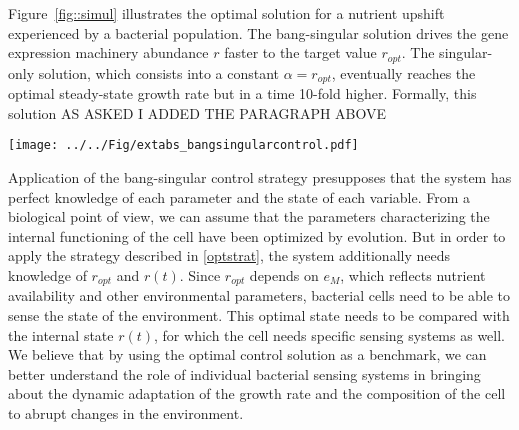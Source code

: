 \documentclass[a4paper, 10pt, conference]{ieeeconf}      %
\begin{document}
Figure~\ref{fig::simul} illustrates the optimal solution for a nutrient upshift experienced by a bacterial population. The bang-singular solution drives the gene expression machinery abundance $r$ faster to the target value $r_{opt}$. The singular-only solution, which consists into a constant $\alpha = r_{opt}$, eventually reaches the optimal steady-state growth rate but in a time 10-fold higher. Formally, this solution
{\color{blue} AS ASKED I ADDED THE PARAGRAPH ABOVE}

\begin{figure*}[h!]
\centering
\texttt{[image: ../../Fig/extabs\_bangsingularcontrol.pdf]}
\caption{\textbf{Bang-singular versus singular control strategies.}
Bang-singular control drives the gene expression machinery abundance $r$ faster to the optimal value $r_{opt}$ than singular control.}
\label{fig::simul}
\end{figure*}

Application of the bang-singular control strategy presupposes that the system has perfect knowledge of each parameter and the state of each variable.
From a biological point of view, we can assume that the parameters characterizing the internal functioning of the cell have been optimized by evolution.
But in order to apply the strategy described in \eqref{optstrat}, the system additionally needs knowledge of $r_{opt}$ and $r(t)$.
Since $r_{opt}$ depends on $e_M$, which reflects nutrient availability and other environmental parameters, bacterial cells need to be able to sense the state of the environment.
This optimal state needs to be compared with the internal state $r(t)$, for which the cell needs specific sensing systems as well.
We believe that by using the optimal control solution as a benchmark, we can better understand the role of individual bacterial sensing systems in bringing about the dynamic adaptation of the growth rate and the composition of the cell to abrupt changes in the environment.





\end{document}
